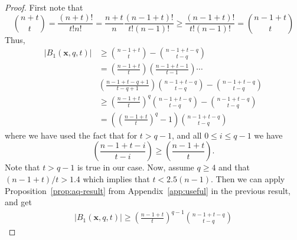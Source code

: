 \documentclass[pdflatex,sn-mathphys-num]{sn-jnl}
\theoremstyle{definition}
\newcommand{\vtr}[1]{\mathbf{#1}}
\begin{document}
\begin{proof}
First note that 
\[
\binom{n + t}{t} = \frac{(n+t)!}{t!n!} = \frac{n+t}{n}\frac{(n-1+t)!}{t!(n-1)!} \geq \frac{(n-1+t)!}{t!(n-1)!} = \binom{n-1+t}{t}
\]
Thus,
\begin{align}
    |B_1(\vtr{x}, q, t)| &\geq \binom{n-1+t}{t} - \binom{n -1 + t - q}{t-q}\nonumber\\
    &= \left( \frac{n-1+t}{t}\right) \left( \frac{n-1+t - 1}{t-1}\right) \cdots \nonumber \\
    &\left( \frac{n-1+t - q+1}{t-q + 1}\right) \binom{n -1 + t - q}{t-q} - \binom{n -1 + t - q}{t-q}\nonumber\\
    &\geq \left( \frac{n-1+t}{t}\right)^q \binom{n -1 + t - q}{t-q} - \binom{n -1 + t - q}{t-q}\label{eq:binom-inequality}\\
    &= \left(\left( \frac{n-1+t}{t}\right)^q - 1 \right) \binom{n -1 + t - q}{t-q} \nonumber
\end{align}
where we have used the fact that for $t > q-1$, and all $0 \leq i \leq q-1$ we have
\[
\left( \frac{n-1+t - i}{t-i}\right) \geq \left( \frac{n-1+t}{t}\right). 
\]
Note that $t > q-1$ is true in our case. 
Now, assume $q \geq 4$ and that $(n-1 + t)/t > 1.4$ which implies that $t < 2.5(n-1)$. Then we can apply  Proposition~\ref{prop:aq-result} from Appendix~\ref{app:useful} in the previous result, and get
\begin{align*}
    |B_1(\vtr{x}, q, t)| \geq \left( \frac{n-1 + t}{t} \right)^{q-1}  \binom{n -1 + t - q}{t-q}
\end{align*}
\end{proof}
\end{document}
